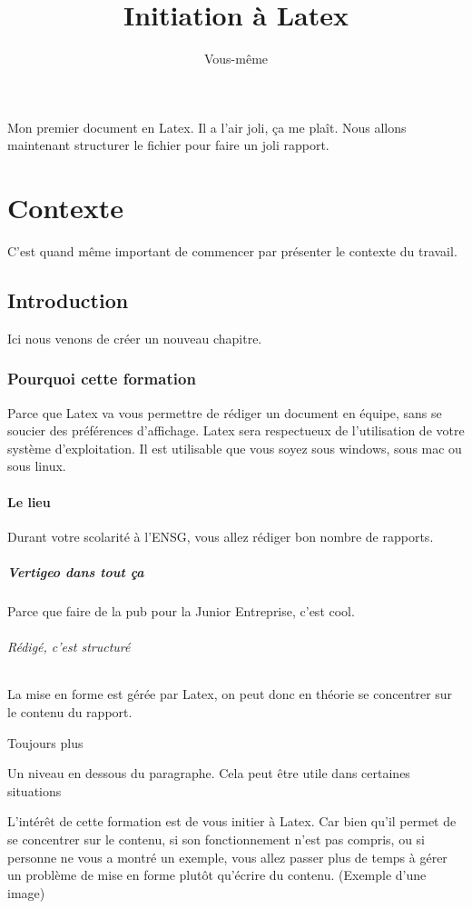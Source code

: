 \documentclass[10pt,a4paper]{report} %
\title{Initiation à Latex}
\author{Vous-même}
\begin{document}
\maketitle
\tableofcontents

Mon premier document en Latex. Il a l'air joli, ça me plaît.
Nous allons maintenant structurer le fichier pour faire un joli rapport.

\part{Contexte}
C'est quand même important de commencer par présenter le contexte du travail.
\chapter{Introduction}
Ici nous venons de créer un nouveau chapitre.
\section{Pourquoi cette formation}
Parce que Latex va vous permettre de rédiger un document en équipe, sans se soucier des préférences d'affichage. Latex sera respectueux de l'utilisation de votre système d'exploitation. Il est utilisable que vous soyez sous windows, sous mac ou sous linux.
\subsection{Le lieu}
Durant votre scolarité à l'ENSG, vous allez rédiger bon nombre de rapports. 
\subsubsection{Vertigeo dans tout ça}
Parce que faire de la pub pour la Junior Entreprise, c'est cool.
\paragraph{Rédigé, c'est structuré}
La mise en forme est gérée par Latex, on peut donc en théorie se concentrer sur le contenu du rapport.
\subparagraph{Toujours plus}
Un niveau en dessous du paragraphe. Cela peut être utile dans certaines situations

L'intérêt de cette formation est de vous initier à Latex. Car bien qu'il permet de se concentrer sur le contenu, si son fonctionnement n'est pas compris, ou si personne ne vous a montré un exemple, vous allez passer plus de temps à gérer un problème de mise en forme plutôt qu'écrire du contenu. (Exemple d'une image)
\end{document}
